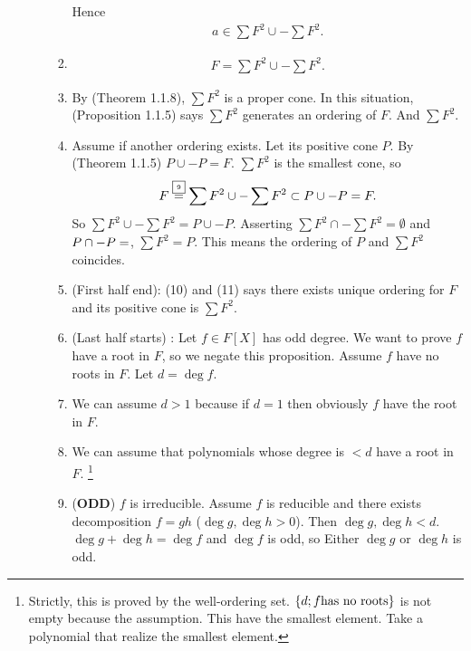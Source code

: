 \documentclass[9pt]{ltjsarticle}
\begin{document}
\begin{itemize}
\begin{itemize}
\begin{enumerate}
\begin{itemize}
      \end{itemize}
      Hence
      \begin{align}
        a \in \sum F^2 \cup -\sum F^2.
      \end{align}
      \item
      \begin{align}
        F = \sum F^2 \cup -\sum F^2.
      \end{align}
      \item
      By (Theorem 1.1.8), $\sum F^2$ is a proper cone.
      In this situation,
      (Proposition 1.1.5) says $\sum F^2$ generates
      an ordering of $F$.
      And $\sum F^2$.
      \item
      Assume if another ordering exists.
      Let its positive cone $P$.
      By (Theorem 1.1.5) $P\cup -P = F$.
      $\sum F^2$ is the smallest cone, so
      \begin{align}
        F
        \overset{\text{\fbox{\tiny 9}}}{=}
        \sum F^2 \cup -\sum F^2
        \subset
        P \cup -P
        =
        F.
      \end{align}
      So $\sum F^2 \cup -\sum F^2 = P \cup -P$.
      Asserting $\sum F^2 \cap -\sum F^2 = \emptyset$ and
      $P \cap -P = \empty$, $\sum F^2 = P$.
      This means the ordering of $P$ and $\sum F^2$ coincides.
      \item  (First half end):
      (10) and (11) says
      there exists unique ordering for $F$ and its positive cone
      is $\sum F^2$.
      \item
      (Last half starts) :
      Let $f\in F[X]$ has odd degree.
      We want to prove $f$ have a root in $F$,
      so we negate this proposition.
      Assume $f$ have no roots in $F$.
      Let $d=\deg f$.
      \item
      We can assume $d > 1$ because
      if $d = 1$ then obviously $f$ have the root in $F$.
      \item
      We can assume that
      polynomials whose degree is $<d$ have a root in $F$.
      \footnote{Strictly, this is proved by the well-ordering set.
      $\left\{d; f \text{has no roots}\right\}$ is not empty because the
      assumption.  This have the smallest element.
      Take a polynomial that realize the smallest element.}
      \item (\textbf{ODD})
      $f$ is irreducible.
      \pf Assume $f$ is reducible and there exists decomposition $f=gh$ ($\deg g,\deg h > 0$).
      Then $\deg g,\deg h< d$.
      $\deg g + \deg h = \deg f$ and $\deg f$ is odd, so
      Either $\deg g$ or $\deg h$ is odd.

\end{enumerate}
\end{itemize}
\end{itemize}
\end{document}
